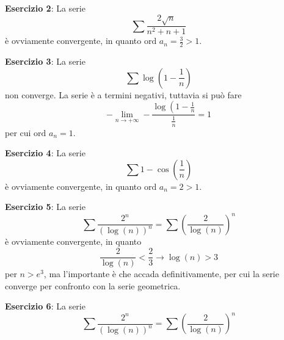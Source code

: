 \documentclass[a4paper]{extarticle}
\begin{document}
\vspace{1em}
\noindent
\textbf{Esercizio 2}: La serie
\[\sum \frac{2\sqrt{n}}{n^2+n+1}\]
è ovviamente convergente, in quanto $\text{ord } a_n = \frac{3}{2} > 1$.

\vspace{1em}
\noindent
\textbf{Esercizio 3}: La serie
\[\sum \log \left(1-\frac{1}{n}\right)\]
non converge. La serie è a termini negativi, tuttavia si può fare
\[-\lim_{n \to +\infty} -\frac{\log \left(1-\frac{1}{n}}{\frac{1}{n}}=1\]
per cui $\text{ord } a_n = 1$.

\vspace{1em}
\noindent
\textbf{Esercizio 4}: La serie
\[\sum 1 - \cos \left(\frac{1}{n}\right)\]
è ovviamente convergente, in quanto $\text{ord } a_n = 2 > 1$.

\vspace{1em}
\noindent
\textbf{Esercizio 5}: La serie
\[\sum \frac{2^n}{(\log(n))^n} = \sum \left(\frac{2}{\log(n)}\right)^n\]
è ovviamente convergente, in quanto
\[\frac{2}{\log(n)} < \frac{2}{3} \rightarrow \log(n) > 3\]
per $n > e^3$, ma l'importante è che accada definitivamente, per cui la serie converge per confronto con la serie geometrica.

\vspace{1em}
\noindent
\textbf{Esercizio 6}: La serie
\[\sum \frac{2^n}{(\log(n))^n} = \sum \left(\frac{2}{\log(n)}\right)^n\]
\end{document}
